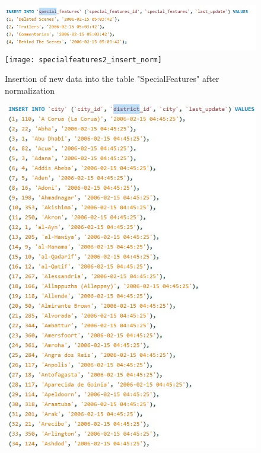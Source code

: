 \documentclass{article}
\begin{document}
		\begin{figure}[H]
			\includegraphics[width=\textwidth]{specialfeatures1_insert_norm}
			\texttt{[image: specialfeatures2\_insert\_norm]}
			\caption{Insertion of new data into the table "Special\textunderscore Features" after normalization}
		\end{figure}
		\begin{figure}[H]
			\includegraphics[width=\textwidth]{district1_insert_norm}

\end{figure}
\end{document}

